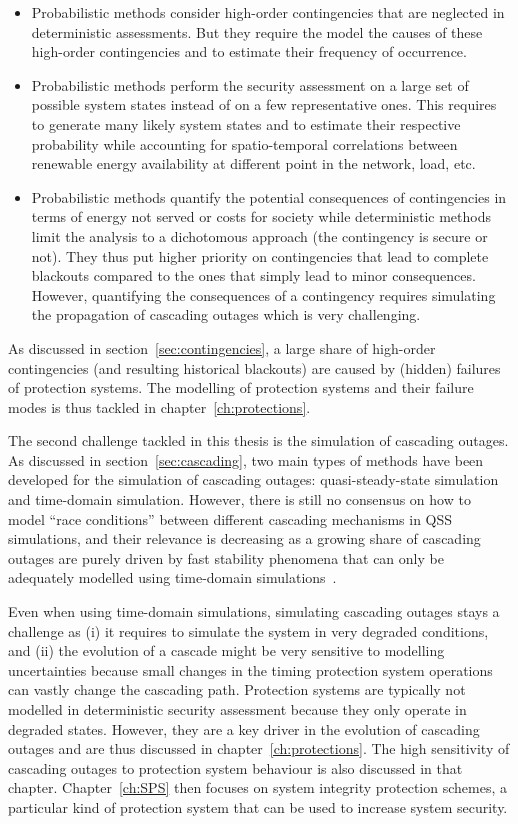 \begin{itemize}
    \item Probabilistic methods consider high-order contingencies that are neglected in deterministic assessments. But they require the model the causes of these high-order contingencies and to estimate their frequency of occurrence.
    \item Probabilistic methods perform the security assessment on a large set of possible system states instead of on a few representative ones. This requires to generate many likely system states and to estimate their respective probability while accounting for spatio-temporal correlations between renewable energy availability at different point in the network, load, etc.
    \item Probabilistic methods quantify the potential consequences of contingencies in terms of energy not served or costs for society while deterministic methods limit the analysis to a dichotomous approach (the contingency is secure or not). They thus put higher priority on contingencies that lead to complete blackouts compared to the ones that simply lead to minor consequences. However, quantifying the consequences of a contingency requires simulating the propagation of cascading outages which is very challenging.
\end{itemize}

As discussed in section~\ref{sec:contingencies}, a large share of high-order contingencies (and resulting historical blackouts) are caused by (hidden) failures of protection systems. The modelling of protection systems and their failure modes is thus tackled in chapter~\ref{ch:protections}.

The second challenge tackled in this thesis is the simulation of cascading outages. As discussed in section~\ref{sec:cascading}, two main types of methods have been developed for the simulation of cascading outages: quasi-steady-state simulation and time-domain simulation. However, there is still no consensus on how to model ``race conditions'' between different cascading mechanisms in QSS simulations, and their relevance is decreasing as a growing share of cascading outages are purely driven by fast stability phenomena that can only be adequately modelled using time-domain simulations~\cite{cascadeAcceleration}.

Even when using time-domain simulations, simulating cascading outages stays a challenge as (i) it requires to simulate the system in very degraded conditions, and (ii) the evolution of a cascade might be very sensitive to modelling uncertainties because small changes in the timing protection system operations can vastly change the cascading path. Protection systems are typically not modelled in deterministic security assessment because they only operate in degraded states. However, they are a key driver in the evolution of cascading outages and are thus discussed in chapter~\ref{ch:protections}. The high sensitivity of cascading outages to protection system behaviour is also discussed in that chapter. Chapter~\ref{ch:SPS} then focuses on system integrity protection schemes, a particular kind of protection system that can be used to increase system security.

